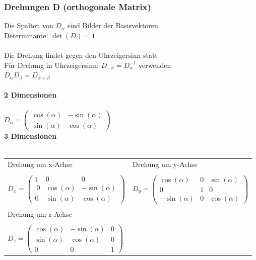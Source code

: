 		  	\subsubsection{Drehungen D (orthogonale Matrix)}
		  	Die Spalten von $D_{\alpha}$ sind Bilder der Basisvektoren \\
		  	Determinante: \quad $\det(D) = 1$\\	
		  	\\
		  	Die Drehung findet gegen den Uhrzeigersinn statt \\
		  	Für Drehung in Uhrzeigersinn: $D_{-\alpha} = D_{\alpha}^{-1}$ verwenden \\
		  	$D_{\alpha} D_{\beta} = D_{\alpha + \beta}$ \\
		  	\\		  	
		  	\textbf{2 Dimensionen} \\
		  	\\
		  	$D_{\alpha} = \begin{pmatrix} \cos(\alpha) & -\sin(\alpha)  \\ \sin(\alpha) & \cos(\alpha)  \end{pmatrix}$ \\
		  	
			\textbf{3 Dimensionen} \\
			\\
			\begin{tabular}{ll}
			Drehung um x-Achse & Drehung um y-Achse \\
			\\
			$D_{x} = \begin{pmatrix} 1 & 0 & 0 \\\
			0 & \cos(\alpha) & -\sin(\alpha)  \\ 0 & \sin(\alpha) & \cos(\alpha)  \end{pmatrix}$ & $D_{y} = \begin{pmatrix} \cos(\alpha) & 0 & \sin(\alpha) \\
			0 & 1 & 0 \\ -\sin(\alpha) & 0 & \cos(\alpha)  \end{pmatrix}$\\
			\\
			Drehung um z-Achse & \\
			\\
			$D_{z} = \begin{pmatrix} \cos(\alpha) & -\sin(\alpha) & 0 \\ \sin(\alpha) & \cos(\alpha) & 0 \\ 0 & 0 & 1 \end{pmatrix}$
			\end{tabular}
		  	

